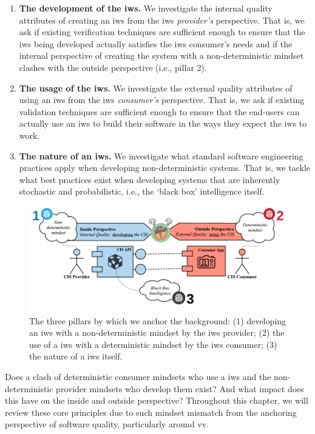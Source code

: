 \begin{enumerate}[label=\textbf{(\arabic*})]
\item \textbf{The development of the \gls{iws}.} We investigate the internal quality attributes of creating an \gls{iws} from the \gls{iws} \textit{provider's} perspective. That is, we ask if existing verification techniques are sufficient enough to ensure that the \gls{iws} being developed actually satisfies the \gls{iws} consumer's needs and if the internal perspective of creating the system with a non-deterministic mindset clashes with the outside perspective (i.e., pillar 2).
\item \textbf{The usage of the \gls{iws}.} We investigate the external quality attributes of using an \gls{iws} from the \gls{iws} \textit{consumer's} perspective. That is, we ask if existing validation techniques are sufficient enough to ensure that the end-users can actually use an \gls{iws} to build their software in the ways they expect the \gls{iws} to work.
\item \textbf{The nature of an \gls{iws}.} We investigate what standard software engineering practices apply when developing non-deterministic systems. That is, we tackle what best practices exist when developing systems that are inherently stochastic and probabilistic, i.e., the `black box' intelligence itself.
\end{enumerate}

\begin{figure}[hbt]
  \centering
  \includegraphics[width=\linewidth]{iws-mindset-clash-pillars}
  \caption[Mindset clashes within the development, use and nature of a IWS]{The three pillars by which we anchor the background: (1) developing an \gls{iws} with a non-deterministic mindset by the \gls{iws} provider; (2) the use of a \gls{iws} with a deterministic mindset by the \gls{iws} consumer; (3) the nature of a \gls{iws} itself.}
  \label{fig:background:preface:iws-mindset-clash-pillars}
\end{figure}

Does a clash of deterministic consumer mindsets who use a \gls{iws} and the non-deterministic provider mindsets who develop them exist? And what impact does this have on the inside and outside perspective? Throughout this chapter, we will review these core principles due to such  mindset mismatch from the anchoring perspective of software quality, particularly around \gls{vv}.




